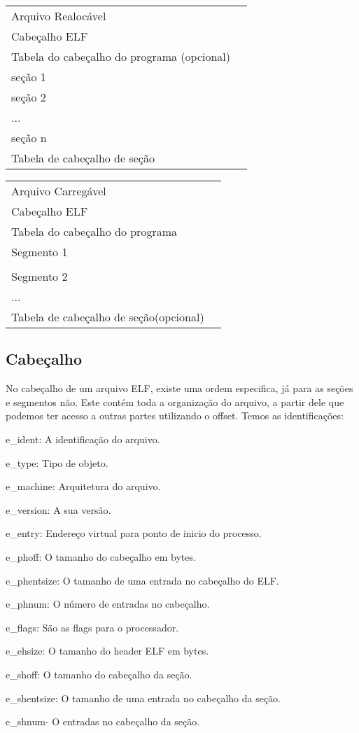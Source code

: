 \begin{tabular}{|l|c|}
\hline
 Arquivo Realocável & \tabularnewline
\cline{1-1}  
Cabeçalho ELF & \tabularnewline
\cline{1-1}
Tabela do cabeçalho do programa (opcional) & \tabularnewline
\cline{1-1} 
seção 1 & \tabularnewline
\cline{1-1} 
seção 2 & \tabularnewline
\cline{1-1} 
... & \tabularnewline
\cline{1-1}
seção n & \tabularnewline
\cline{1-1} 
Tabela de cabeçalho de seção & \tabularnewline
\cline{1-1}
\end{tabular}
\begin{tabular}{|l|c|}
\hline
Arquivo Carregável &\tabularnewline
\cline{1-1}
Cabeçalho ELF & \tabularnewline
\cline{1-1}
Tabela do cabeçalho do programa & \tabularnewline
\cline{1-1} 
Segmento 1 & \tabularnewline
\cline{1-1} 
 & \tabularnewline
\cline{1-1}
Segmento 2 & \tabularnewline
\cline{1-1}
... & \tabularnewline
\cline{1-1}
Tabela de cabeçalho de seção(opcional) & \tabularnewline
\cline{1-1}
\end{tabular}

\subsection{Cabeçalho}
   No cabeçalho de um arquivo ELF, existe uma ordem especifica, já para as seções e segmentos não.
   Este contém toda a organização do arquivo, a partir dele que podemos ter acesso a outras partes utilizando o offset.
   Temos as identificações:

   e_ident: A identificação do arquivo.

   e_type: Tipo de objeto.

   e_machine: Arquitetura do arquivo.
   
   e_version: A sua versão.
  
   e_entry: Endereço virtual para ponto de inicio do processo.
   
   e_phoff: O tamanho do cabeçalho em bytes.
   
   e_phentsize: O tamanho de uma entrada no cabeçalho do ELF.
   
   e_phnum: O número de entradas no cabeçalho.
   
   e_flags: São as flags para o processador.
   
   e_ehsize: O tamanho do header ELF em bytes.
   
   e_shoff: O tamanho do cabeçalho da seção.
   
   e_shentsize: O tamanho de uma entrada no cabeçalho da seção.

   e_shnum- O entradas no cabeçalho da seção.
   
